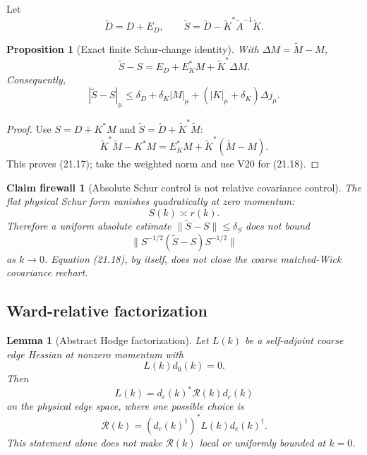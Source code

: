 \documentclass[11pt,oneside]{book}
\newtheorem{lemma}[theorem]{Lemma}
\newtheorem{proposition}[theorem]{Proposition}
\newtheorem{firewall}[theorem]{Claim firewall}
\theoremstyle{definition}
\theoremstyle{remark}
\begin{document}
Let
\[
\widetilde D=D+E_D,\qquad
\widetilde S=\widetilde D-\widetilde K^*
                    \widetilde A^{-1}\widetilde K.                 \tag{21.16}
\]

\begin{proposition}[Exact finite Schur-change identity]
\label{prop:e8v21-Schur-change}
With \(\Delta M=\widetilde M-M\),
\[
\boxed{\qquad
\widetilde S-S
=E_D+E_K^*M+\widetilde K^*\Delta M.
\qquad}                                                           \tag{21.17}
\]
Consequently,
\[
|\widetilde S-S|_\mu
\leq\delta_D+\delta_K|M|_\mu
 +( |K|_\mu+\delta_K)\Delta j_\mu.                \tag{21.18}
\]
\end{proposition}

\begin{proof}
Use \(S=D+K^*M\) and
\(\widetilde S=\widetilde D+\widetilde K^*\widetilde M\):
\[
\widetilde K^*\widetilde M-K^*M
=E_K^*M+\widetilde K^*(\widetilde M-M).
\]
This proves (21.17); take the weighted norm and use V20 for (21.18).
\end{proof}

\begin{firewall}[Absolute Schur control is not relative covariance
control]
\label{fire:e8v21-absolute}
The flat physical Schur form vanishes quadratically at zero momentum:
\[
                         S(k)\asymp r(k).
\]
Therefore a uniform absolute estimate
\(\|\widetilde S-S\|\leq\delta_S\) does not bound
\[
\|S^{-1/2}(\widetilde S-S)S^{-1/2}\|
\]
as \(k\to0\).  Equation (21.18), by itself, does not close the coarse
matched-Wick covariance rechart.
\end{firewall}

\subsection{Ward-relative factorization}

\begin{lemma}[Abstract Hodge factorization]
\label{lem:e8v21-Hodge}
Let \(L(k)\) be a self-adjoint coarse edge Hessian at nonzero momentum
with
\[
                         L(k)d_0(k)=0.                             \tag{21.19}
\]
Then
\[
                         L(k)=d_c(k)^*\mathcal R(k)d_c(k)           \tag{21.20}
\]
on the physical edge space, where one possible choice is
\[
\mathcal R(k)=
(d_c(k)^\dagger)^*L(k)d_c(k)^\dagger.              \tag{21.21}
\]
This statement alone does not make \(\mathcal R(k)\) local or
uniformly bounded at \(k=0\).
\end{lemma}
\end{document}

